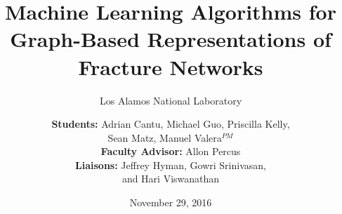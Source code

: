 \documentclass{beamer}
\title[Machine Learning for Graph-Based Fracture Networks Presentation]{Machine Learning Algorithms for Graph-Based Representations of Fracture Networks}
\subtitle[LANL]{Los Alamos National Laboratory}
\author[A. Cantu, M. Guo, P. Kelly, S. Matz, M. Valera]{\textbf{Students:} Adrian Cantu, Michael Guo, Priscilla Kelly,\\ Sean Matz, Manuel Valera$^{PM}$ \\ \textbf{Faculty Advisor:} Allon Percus \\ \textbf{Liaisons:} Jeffrey Hyman, Gowri Srinivasan, \\and Hari Viswanathan}
\institute[CGU]{Claremont Graduate University}
\date{November 29, 2016}
\begin{document}
\frame{\titlepage}




%
%
\end{document}
